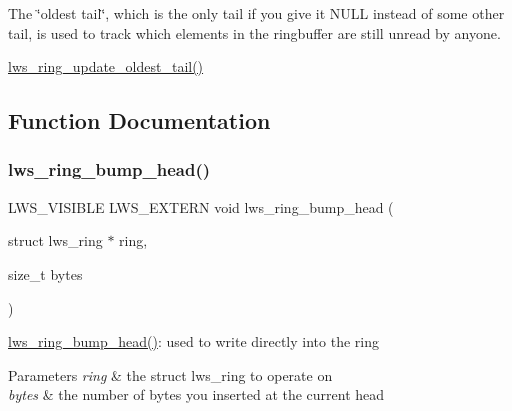 The \char`\"{}oldest tail\char`\"{}, which is the only tail if you give it N\+U\+LL instead of some other tail, is used to track which elements in the ringbuffer are still unread by anyone.


\begin{DoxyItemize}
\item \hyperlink{group__lws__ring_gac4ec0634b0a901c4cc9cad33fcd7273b}{lws\+\_\+ring\+\_\+update\+\_\+oldest\+\_\+tail()} 
\end{DoxyItemize}

\subsection{Function Documentation}
\mbox{\label{group__lws__ring_gaef516991b6b0268a639f76a01def2f87}} 
\subsubsection{\texorpdfstring{lws\+\_\+ring\+\_\+bump\+\_\+head()}{lws\_ring\_bump\_head()}}
{\footnotesize\ttfamily L\+W\+S\+\_\+\+V\+I\+S\+I\+B\+LE L\+W\+S\+\_\+\+E\+X\+T\+E\+RN void lws\+\_\+ring\+\_\+bump\+\_\+head (\begin{DoxyParamCaption}\item[{struct lws\+\_\+ring $\ast$}]{ring,  }\item[{size\+\_\+t}]{bytes }\end{DoxyParamCaption})}

\hyperlink{group__lws__ring_gaef516991b6b0268a639f76a01def2f87}{lws\+\_\+ring\+\_\+bump\+\_\+head()}\+: used to write directly into the ring


\begin{DoxyParams}{Parameters}
{\em ring} & the struct lws\+\_\+ring to operate on \\
\hline
{\em bytes} & the number of bytes you inserted at the current head \\
\hline
\end{DoxyParams}
\mbox{\label{group__lws__ring_ga1ad6706af708096eba401a48f67bf865}} 
